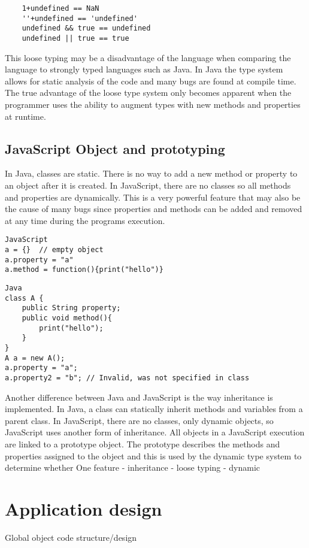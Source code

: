 \documentclass{report}
\begin{document}
	\begin{verbatim}
	1+undefined == NaN
	''+undefined == 'undefined'
	undefined && true == undefined
	undefined || true == true
	\end{verbatim}
This loose typing may be a disadvantage of the language when comparing the language to strongly typed languages such as Java. In Java the type system allows for static analysis of the code and many bugs are found at compile time. The true advantage of the loose type system only becomes apparent when the programmer uses the ability to augment types with new methods and properties at runtime.

	\subsection{JavaScript Object and prototyping}
	In Java, classes are static. There is no way to add a new method or property to an object after it is created. In JavaScript, there are no classes so all methods and properties are dynamically. This is a very powerful feature that may also be the cause of many bugs since properties and methods can be added and removed at any time during the programs execution.
\begin{verbatim}
JavaScript
a = {} 	// empty object
a.property = "a"
a.method = function(){print("hello")}
\end{verbatim}

\begin{verbatim}
Java
class A {
	public String property;
	public void method(){
		print("hello");
	}
}
A a = new A();
a.property = "a";
a.property2 = "b"; // Invalid, was not specified in class
\end{verbatim}
Another difference between Java and JavaScript is the way inheritance is implemented. In Java, a class can statically inherit methods and variables from a parent class. In JavaScript, there are no classes, only dynamic objects, so JavaScript uses another form of inheritance. All objects in a JavaScript execution are linked to a prototype object. The prototype describes the methods and properties assigned to the object and this is used by the dynamic type system to determine whether 
	One feature
	- inheritance
	- loose typing
	- dynamic
\section{Application design}
	Global object
	code structure/design
\end{document}
